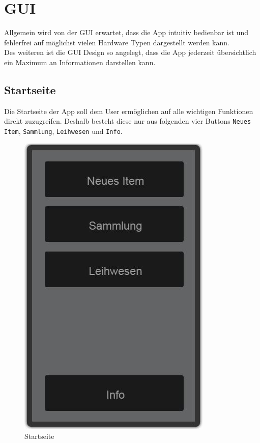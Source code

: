 \section{GUI}

Allgemein wird von der GUI erwartet, dass die App intuitiv bedienbar ist und fehlerfrei auf möglichst vielen Hardware Typen dargestellt werden kann. \\

Des weiteren ist die GUI  Design so angelegt, dass die App jederzeit übersichtlich ein Maximum an Informationen darstellen kann.

\subsection{Startseite}
\label{subsec:Startseite}

Die Startseite der App soll dem User ermöglichen auf alle wichtigen Funktionen direkt zuzugreifen. Deshalb besteht diese nur aus folgenden vier Buttons {\color{IndianRed}\texttt{Neues Item}}, {\color{IndianRed}\texttt{Sammlung}}, {\color{IndianRed}\texttt{Leihwesen}} und {\color{IndianRed}\texttt{Info}}.

\begin{figure}[htbp]
	\centering
	\includegraphics[scale=0.5]{pic/GUI/Main}
	\caption{Startseite}
\end{figure}

